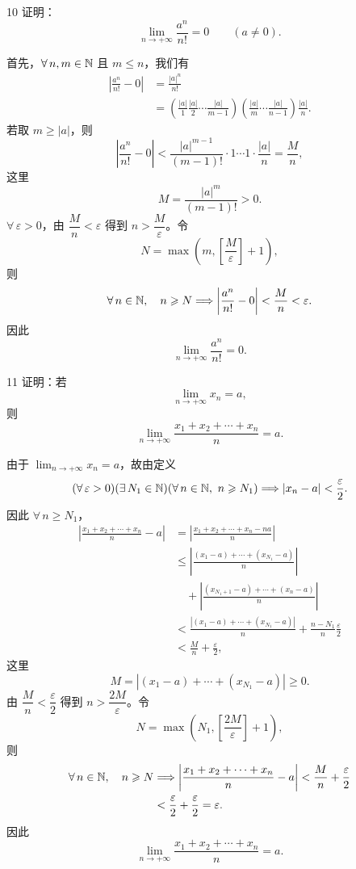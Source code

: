 \begin{sourceexample}{10}
证明：
\[
\lim_{n\to+\infty}\frac{a^n}{n!}=0
\qquad(a\neq0).
\]

首先，\(\forall\,n,m\in\mathbb{N}\) 且 \(m\leqslant n\)，我们有
\[
\begin{aligned}
\left|\frac{a^n}{n!}-0\right|
&=\frac{|a|^n}{n!}\\
&=\left(\frac{|a|}{1}\frac{|a|}{2}\cdots\frac{|a|}{m-1}\right)
  \left(\frac{|a|}{m}\cdots\frac{|a|}{n-1}\right)\frac{|a|}{n}.
\end{aligned}
\]
若取 \(m\geqslant|a|\)，则
\[
\left|\frac{a^n}{n!}-0\right|
<\frac{|a|^{m-1}}{(m-1)!}\cdot1\cdots1\cdot\frac{|a|}{n}
=\frac Mn,
\]
这里
\[
M=\frac{|a|^m}{(m-1)!}>0.
\]
\(\forall\,\varepsilon>0\)，由 \(\dfrac Mn<\varepsilon\) 得到
\(n>\dfrac M\varepsilon\)。令
\[
N=\max\left(m,\left[\frac M\varepsilon\right]+1\right),
\]
则
\[
\forall\,n\in\mathbb{N},\quad n\geqslant N
\Longrightarrow
\left|\frac{a^n}{n!}-0\right|<\frac Mn<\varepsilon.
\]
因此
\[
\lim_{n\to+\infty}\frac{a^n}{n!}=0.
\]
\end{sourceexample}

\begin{sourceexample}{11}
证明：若
\[
\lim_{n\to+\infty}x_n=a,
\]
则
\[
\lim_{n\to+\infty}\frac{x_1+x_2+\cdots+x_n}{n}=a.
\]

由于 \(\lim_{n\to+\infty}x_n=a\)，故由定义
\[
(\forall\,\varepsilon>0)(\exists\,N_1\in\mathbb{N})
(\forall\,n\in\mathbb{N},\ n\geqslant N_1)
\Longrightarrow |x_n-a|<\frac\varepsilon2.
\]
因此 \(\forall\,n\geqslant N_1\)，
\[
\begin{aligned}
\left|\frac{x_1+x_2+\cdots+x_n}{n}-a\right|
&=\left|\frac{x_1+x_2+\cdots+x_n-na}{n}\right|\\
&\leqslant
\left|\frac{(x_1-a)+\cdots+(x_{N_1}-a)}{n}\right|\\
&\quad+
\left|\frac{(x_{N_1+1}-a)+\cdots+(x_n-a)}{n}\right|\\
&<\frac{|(x_1-a)+\cdots+(x_{N_1}-a)|}{n}
+\frac{n-N_1}{n}\frac\varepsilon2\\
&<\frac Mn+\frac\varepsilon2,
\end{aligned}
\]
这里
\[
M=|(x_1-a)+\cdots+(x_{N_1}-a)|\geqslant0.
\]
由 \(\dfrac Mn<\dfrac\varepsilon2\) 得到
\(n>\dfrac{2M}{\varepsilon}\)。令
\[
N=\max\left(N_1,\left[\frac{2M}{\varepsilon}\right]+1\right),
\]
则
\[
\begin{aligned}
\forall\,n\in\mathbb{N},\quad n\geqslant N
&\Longrightarrow
\left|\frac{x_1+x_2+\cdots+x_n}{n}-a\right|
<\frac Mn+\frac\varepsilon2\\
&<\frac\varepsilon2+\frac\varepsilon2=\varepsilon.
\end{aligned}
\]
因此
\[
\lim_{n\to+\infty}\frac{x_1+x_2+\cdots+x_n}{n}=a.
\]
\end{sourceexample}

